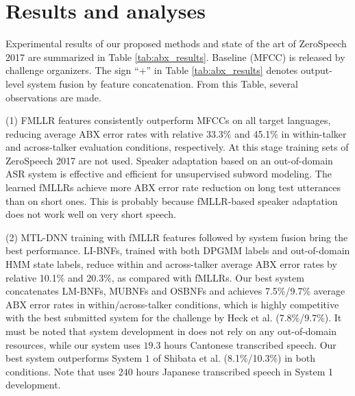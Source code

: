 \documentclass[a4paper]{article}
\newcommand{\quotes}[1]{``#1''}
\begin{document}

\section{Results and analyses}
Experimental results of our proposed methods and state of the art of ZeroSpeech 2017 are summarized in Table \ref{tab:abx_results}. Baseline (MFCC) is released by challenge organizers. The sign \quotes{+} in Table \ref{tab:abx_results} denotes output-level system fusion by feature concatenation. From this Table, several observations are made.

(1) FMLLR features consistently outperform MFCCs on all target languages, reducing   average ABX  error rates with relative 33.3\% and 45.1\% in within-talker and across-talker evaluation conditions, respectively. At this stage training sets of ZeroSpeech 2017 are not used. Speaker adaptation based on an out-of-domain ASR system is effective and efficient for unsupervised subword modeling. The learned fMLLRs
achieve more ABX error rate reduction on long test utterances than on short ones. This is probably because fMLLR-based speaker adaptation does not work well on very short speech. 

(2) MTL-DNN training with fMLLR features followed by system fusion  bring the best performance. LI-BNFs, trained with both DPGMM labels and out-of-domain HMM state labels, 
reduce within and across-talker average ABX error rates by relative 10.1\% and 20.3\%, as compared with fMLLRs. Our best system concatenates LM-BNFs, MUBNFs and OSBNFs and achieves 7.5\%/9.7\% average ABX error rates in within/across-talker conditions, which is highly competitive  with the best submitted system for the challenge  by Heck et al. \cite{heck2017feature} (7.8\%/9.7\%). It must be noted that system development in \cite{heck2017feature} does not rely on any out-of-domain  resources, while our system uses $19.3$ hours Cantonese transcribed speech. Our best system outperforms System $1$ of Shibata et al. \cite{shibata2017composite} (8.1\%/10.3\%) in both 
conditions. Note that \cite{shibata2017composite} uses $240$ hours Japanese transcribed speech in System 1 development. 
\end{document}
